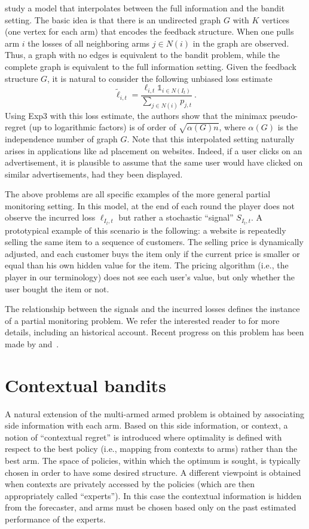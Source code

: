 \documentclass[11pt]{hackednow}
\def\ds1{\mathds{1}}
\renewcommand{\tilde}{\widetilde}
\begin{document}
\cite{MS11} study a model that interpolates between the full information and the bandit setting. The basic idea is that there is an undirected graph $G$ with $K$ vertices (one vertex for each arm) that encodes the feedback structure. When one pulls arm $i$ the losses of all neighboring arms $j \in N(i)$ in the graph are observed. Thus, a graph with no edges is equivalent to the bandit problem, while the complete graph is equivalent to the full information setting. Given the feedback structure $G$, it is natural to consider the following unbiased loss estimate
\[
    \tilde{\ell}_{i,t} = \frac{\ell_{i,t} \ds1_{i \in N(I_t)}}{\sum_{j \in N(i)} p_{j,t}}~.
\]
Using Exp3 with this loss estimate, the authors show that the minimax pseudo-regret (up to logarithmic factors) is of order of $\sqrt{\alpha(G) n}$, where $\alpha(G)$ is the independence number of graph $G$. Note that this interpolated setting naturally arises in applications like ad placement on websites. Indeed, if a user clicks on an advertisement, it is plausible to assume that the same user would have clicked on similar advertisements, had they been displayed.

The above problems are all specific examples of the more general partial monitoring setting. In this model, at the end of each round the player does not observe the incurred loss $\ell_{I_t,t}$ but rather a stochastic ``signal'' $S_{I_t,t}$. A prototypical example of this scenario is the following: a website is repeatedly selling the same item to a sequence of customers. The selling price is dynamically adjusted, and each customer buys the item only if the current price is smaller or equal than his own hidden value for the item. The pricing algorithm (i.e., the player in our terminology) does not see each user's value, but only whether the user bought the item or not.

The relationship between the signals and the incurred losses defines the instance of a partial monitoring problem. We refer the interested reader to \cite{CL06} for more details, including an historical account. Recent progress on this problem has been made by \cite{BPS10} and~\cite{FR11}.
 
\chapter{Contextual bandits}
\label{contextual}
A natural extension of the multi-armed armed problem is obtained by associating side information with each arm. Based on this side information, or context, a notion of ``contextual regret'' is introduced where optimality is defined with respect to the best policy (i.e., mapping from contexts to arms) rather than the best arm. The space of policies, within which the optimum is sought, is typically chosen in order to have some desired structure. A different viewpoint is obtained when contexts are privately accessed by the policies (which are then appropriately called ``experts''). In this case the contextual information is hidden from the forecaster, and arms must be chosen based only on the past estimated performance of the experts.
\end{document}
